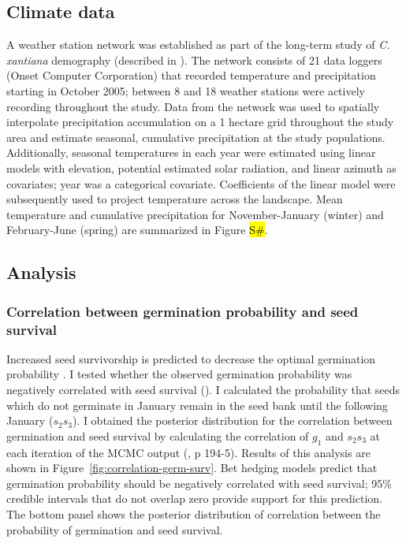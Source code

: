 \documentclass[12pt, oneside, titlepage]{article}   	%
\begin{document}
{%

\subsection{Climate data}

A weather station network was established as part of the long-term study of \textit{C. xantiana} demography (described in \cite{eckhart2011}). The network consists of 21 data loggers (Onset Computer Corporation) that recorded temperature and precipitation starting in October 2005; between 8 and 18 weather stations were actively recording throughout the study. Data from the network was used to spatially interpolate precipitation accumulation on a 1 hectare grid throughout the study area and estimate seasonal, cumulative precipitation at the study populations. Additionally, seasonal temperatures in each year were estimated using linear models with elevation, potential estimated solar radiation, and linear azimuth as covariates; year was a categorical covariate. Coefficients of the linear model were subsequently used to project temperature across the landscape. Mean temperature and cumulative precipitation for November-January (winter) and February-June (spring) are summarized in Figure \hl{S\#}.

\subsection{Analysis}

\subsubsection{Correlation between germination probability and seed survival}

Increased seed survivorship is predicted to decrease the optimal germination probability \cite{cohen1966,ellner1985a}. I tested whether the observed germination probability was negatively correlated with seed survival (\cite{gremer2014}). I calculated the probability that seeds which do not germinate in January remain in the seed bank until the following January ($s_2 s_3$). I obtained the posterior distribution for the correlation between germination and seed survival by calculating the correlation of $g_1$ and $s_2 s_3$ at each iteration of the MCMC output (\cite{hobbs2015b}, p 194-5). Results of this analysis are shown in Figure~\ref{fig:correlation-germ-surv}. Bet hedging models predict that germination probability should be negatively correlated with seed survival; 95\% credible intervals that do not overlap zero provide support for this prediction. The bottom panel shows the posterior distribution of correlation between the probability of germination and seed survival. 

}
\end{document}
